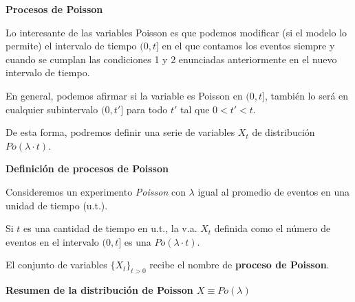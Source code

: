 \documentclass[]{book}
\begin{document}
\textbf{Procesos de Poisson}

Lo interesante de las variables Poisson es que podemos modificar (si el modelo lo permite) el intervalo de tiempo \((0,t]\) en el que contamos los eventos siempre y cuando se cumplan las condiciones 1 y 2 enunciadas anteriormente en el nuevo intervalo de tiempo.

En general, podemos afirmar si la variable es Poisson en \((0,t]\), también lo será en cualquier subintervalo \((0,t']\) para todo \(t'\) tal que \(0<t'<t\).

De esta forma, podremos definir una serie de variables \(X_t\) de distribución \(Po(\lambda\cdot t)\).

\textbf{Definición de procesos de Poisson}

Consideremos un experimento \emph{Poisson} con \(\lambda\) igual
al promedio de eventos en una unidad de tiempo (u.t.).

Si \(t\) es una cantidad de tiempo en u.t., la v.a. \(X_{t}\) definida como el número de eventos en el intervalo \((0,t]\) es una \(Po(\lambda\cdot t)\).

El conjunto de variables \(\{X_t\}_{t>0}\) recibe el nombre de \textbf{proceso de Poisson}.

\textbf{Resumen de la distribución de Poisson \(X\equiv Po(\lambda)\)}
\end{document}
